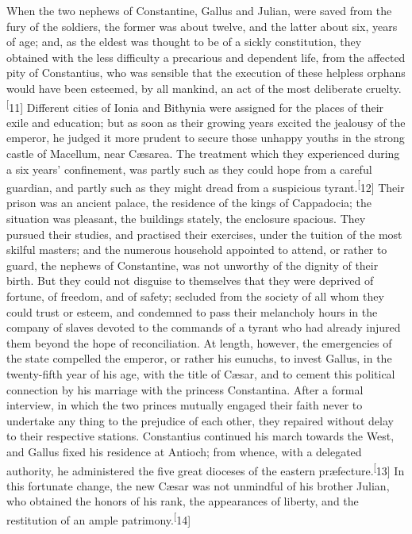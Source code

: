 When the two nephews of Constantine, Gallus and Julian, were
saved from the fury of the soldiers, the former was about twelve,
and the latter about six, years of age; and, as the eldest was
thought to be of a sickly constitution, they obtained with the
less difficulty a precarious and dependent life, from the
affected pity of Constantius, who was sensible that the execution
of these helpless orphans would have been esteemed, by all
mankind, an act of the most deliberate cruelty.\textsuperscript[11] Different
cities of Ionia and Bithynia were assigned for the places of
their exile and education; but as soon as their growing years
excited the jealousy of the emperor, he judged it more prudent to
secure those unhappy youths in the strong castle of Macellum,
near Cæsarea. The treatment which they experienced during a six
years’ confinement, was partly such as they could hope from a
careful guardian, and partly such as they might dread from a
suspicious tyrant.\textsuperscript[12] Their prison was an ancient palace, the
residence of the kings of Cappadocia; the situation was pleasant,
the buildings stately, the enclosure spacious. They pursued their
studies, and practised their exercises, under the tuition of the
most skilful masters; and the numerous household appointed to
attend, or rather to guard, the nephews of Constantine, was not
unworthy of the dignity of their birth. But they could not
disguise to themselves that they were deprived of fortune, of
freedom, and of safety; secluded from the society of all whom
they could trust or esteem, and condemned to pass their
melancholy hours in the company of slaves devoted to the commands
of a tyrant who had already injured them beyond the hope of
reconciliation. At length, however, the emergencies of the state
compelled the emperor, or rather his eunuchs, to invest Gallus,
in the twenty-fifth year of his age, with the title of Cæsar, and
to cement this political connection by his marriage with the
princess Constantina. After a formal interview, in which the two
princes mutually engaged their faith never to undertake any thing
to the prejudice of each other, they repaired without delay to
their respective stations. Constantius continued his march
towards the West, and Gallus fixed his residence at Antioch; from
whence, with a delegated authority, he administered the five
great dioceses of the eastern præfecture.\textsuperscript[13] In this fortunate
change, the new Cæsar was not unmindful of his brother Julian,
who obtained the honors of his rank, the appearances of liberty,
and the restitution of an ample patrimony.\textsuperscript[14]

